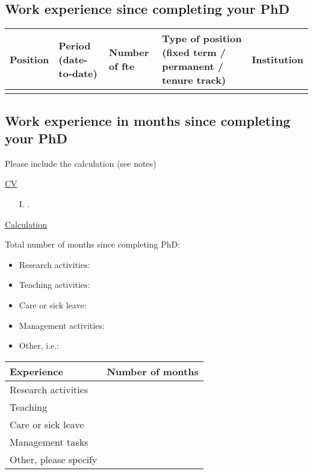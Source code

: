 \subsection{Work experience since completing your PhD}

\begin{table}[h!]
\flushleft
\begin{tabular}{p{6em} p{9em} p{4em} p{7em} p{9em}}
\hline
\T \textbf{Position} & {\textbf{Period} (date-to-date)}& \textbf{Number of
fte} &\textbf{Type of position} (fixed term / permanent / tenure
track) \B&\textbf{Institution}\\
\hline
\T \\
\hline
\end{tabular}
\end{table}

\subsection*{Work experience in months since completing your PhD}
Please include the calculation (see notes)

\underline{CV}

\begin{itemize}
\item [I.] .
\end{itemize}

\underline{Calculation}

Total number of months since completing PhD: \\
\begin{itemize}
  \item Research activities: 
  \item Teaching activities: 
	\item Care or sick leave: 
  \item Management activities: 
	\item Other, i.e.:
\end{itemize}

\begin{table}[h!]
\flushleft
\small
\begin{tabular}{ll}
\hline
\T\B\textbf{Experience}&\textbf{Number of months}\\
\hline
\T Research activities&\\
\T Teaching&\\
\T Care or sick leave&\\
\T Management tasks&\\
\T\B Other, please specify&\\
\hline
\end{tabular}
\end{table}

